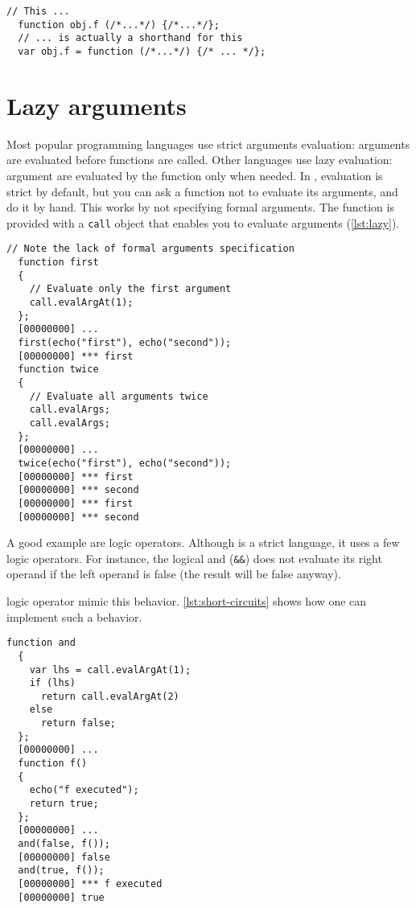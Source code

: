 \documentclass[openright,twoside,12pt]{report}
\newcommand{\lst}[1]{\autoref{lst:#1}}
\begin{document}
\begin{lstlisting}[caption=The function sugar,
  label=lst:function-sugar]
  // This ...
  function obj.f (/*...*/) {/*...*/};
  // ... is actually a shorthand for this
  var obj.f = function (/*...*/) {/* ... */};
\end{lstlisting}

\section{Lazy arguments}

Most popular programming languages use strict arguments evaluation:
arguments are evaluated before functions are called. Other languages
use lazy evaluation: argument are evaluated by the function only when
needed. In \urbi, evaluation is strict by default, but you can ask a
function not to evaluate its arguments, and do it by hand. This works
by not specifying formal arguments. The function is provided with a
\texttt{call} object that enables you to evaluate arguments
(\lst{lazy}).

\begin{lstlisting}[caption=Tweaking arguments evaluation,
  label=lst:lazy]
  // Note the lack of formal arguments specification
  function first
  {
    // Evaluate only the first argument
    call.evalArgAt(1);
  };
  [00000000] ...
  first(echo("first"), echo("second"));
  [00000000] *** first
  function twice
  {
    // Evaluate all arguments twice
    call.evalArgs;
    call.evalArgs;
  };
  [00000000] ...
  twice(echo("first"), echo("second"));
  [00000000] *** first
  [00000000] *** second
  [00000000] *** first
  [00000000] *** second
\end{lstlisting}

A good example are logic operators. Although \Cxx is a strict
language, it uses a few logic operators. For instance, the logical and
(\texttt{\&\&}) does not evaluate its right operand if the left
operand is false (the result will be false anyway).

\urbi logic operator mimic this behavior. \lst{short-circuits} shows
how one can implement such a behavior.

\begin{lstlisting}[caption=Implementing logic short circuits,
  label=lst:short-circuits]
  function and
  {
    var lhs = call.evalArgAt(1);
    if (lhs)
      return call.evalArgAt(2)
    else
      return false;
  };
  [00000000] ...
  function f()
  {
    echo("f executed");
    return true;
  };
  [00000000] ...
  and(false, f());
  [00000000] false
  and(true, f());
  [00000000] *** f executed
  [00000000] true
\end{lstlisting}
\end{document}
